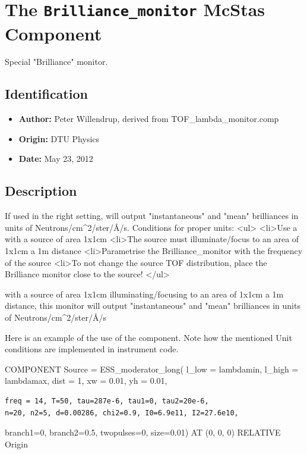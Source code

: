 \section{The \texttt{Brilliance\_monitor} McStas Component}
Special "Brilliance" monitor.

\subsection*{Identification}
\begin{itemize}
  \item \textbf{Author:} Peter Willendrup, derived from TOF\_lambda\_monitor.comp
  \item \textbf{Origin:} DTU Physics
  \item \textbf{Date:} May 23, 2012
\end{itemize}

\subsection*{Description}
If used in the right setting, will output "instantaneous" and "mean" brilliances in units of Neutrons/cm\textasciicircum{}2/ster/\AA{}/s. Conditions for proper units: \textless{}ul\textgreater{} \textless{}li\textgreater{}Use a with a source of area 1x1cm \textless{}li\textgreater{}The source must illuminate/focus to an area of 1x1cm a 1m distance \textless{}li\textgreater{}Parametrise the Brilliance\_monitor with the frequency of the source \textless{}li\textgreater{}To not change the source TOF distribution, place the Brilliance monitor close to the source! \textless{}/ul\textgreater{}

with a source of area 1x1cm illuminating/focusing to an area of 1x1cm a 1m distance, this monitor will output "instantaneous" and "mean" brilliances in units of Neutrons/cm\textasciicircum{}2/ster/\AA{}/s

Here is an example of the use of the component. Note how the mentioned Unit conditions are implemented in instrument code.

COMPONENT Source = ESS\_moderator\_long( l\_low = lambdamin, l\_high = lambdamax, dist = 1, xw = 0.01, yh = 0.01,

\begin{verbatim}
freq = 14, T=50, tau=287e-6, tau1=0, tau2=20e-6,
n=20, n2=5, d=0.00286, chi2=0.9, I0=6.9e11, I2=27.6e10,
\end{verbatim}

branch1=0, branch2=0.5, twopulses=0, size=0.01) AT (0, 0, 0) RELATIVE Origin

